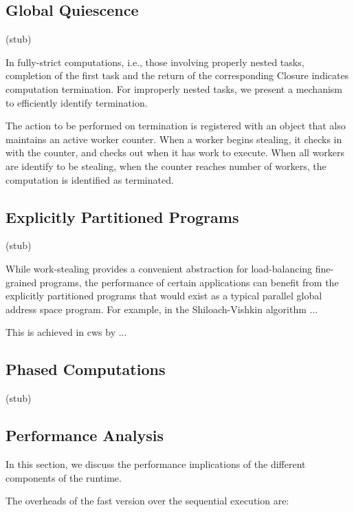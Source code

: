 \subsection{Global Quiescence}

(stub)

In fully-strict computations, i.e., those involving properly nested
tasks, completion of the first task and the return of the
corresponding Closure indicates computation termination. For
improperly nested tasks, we present a mechanism to efficiently
identify termination. 

The action to be performed on termination is registered with an object
that also maintains an active worker counter. When a worker begins
stealing, it checks in with the counter, and checks out when it has
work to execute. When all workers are identify to be stealing, when
the counter reaches number of workers, the computation is identified
as terminated. 


\subsection{Explicitly Partitioned Programs}

(stub)

While work-stealing provides a convenient abstraction for
load-balancing fine-grained programs, the performance of certain
applications can benefit from the explicitly partitioned programs that
would exist as a typical parallel global address space program. For
example, in the Shiloach-Vishkin algorithm ...

This is achieved in cws by ...


\subsection{Phased Computations}

(stub)


\subsection{Performance Analysis}

In this section, we discuss the performance implications of the
different components of the runtime. 

The overheads of the fast version over the sequential execution are:

